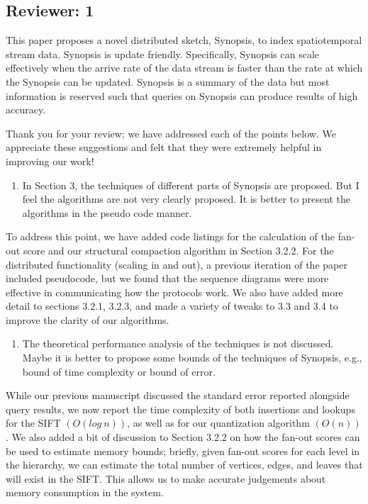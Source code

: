 \documentclass{article}
\begin{document}
\subsection*{Reviewer: 1}\label{reviewer-1}

This paper proposes a novel distributed sketch, Synopsis, to index
spatiotemporal stream data. Synopsis is update friendly. Specifically,
Synopsis can scale effectively when the arrive rate of the data stream
is faster than the rate at which the Synopsis can be updated. Synopsis
is a summary of the data but most information is reserved such that
queries on Synopsis can produce results of high accuracy.

\begin{tcolorbox}
Thank you for your review; we have addressed each of the points below. We appreciate these suggestions and felt that they were extremely helpful in improving our work!
\end{tcolorbox}

\begin{enumerate}
\def\labelenumi{\arabic{enumi})}
\item
  In Section 3, the techniques of different parts of Synopsis are
  proposed. But I feel the algorithms are not very clearly proposed. It
  is better to present the algorithms in the pseudo code manner.
\end{enumerate}

\begin{tcolorbox}
To address this point, we have added code listings for the calculation
of the fan-out score and our structural compaction algorithm in Section
3.2.2. For the distributed functionality (scaling in and out), a
previous iteration of the paper included pseudocode, but we found that
the sequence diagrams were more effective in communicating how the
protocols work. We also have added more detail to sections 3.2.1, 3.2.3,
and made a variety of tweaks to 3.3 and 3.4 to improve the clarity of
our algorithms.
\end{tcolorbox}

\begin{enumerate}
\def\labelenumi{\arabic{enumi})}
\setcounter{enumi}{1}
\item
  The theoretical performance analysis of the techniques is not
  discussed. Maybe it is better to propose some bounds of the techniques
  of Synopsis, e.g., bound of time complexity or bound of error.
\end{enumerate}

\begin{tcolorbox}
While our previous manuscript discussed the standard error reported alongside query results, we now report the time complexity of both insertions and lookups for the SIFT $(O(log\ n))$, as well as for our quantization algorithm $(O(n))$. We also added a bit of discussion to Section 3.2.2 on how the fan-out scores can be used to estimate memory bounds; briefly, given fan-out scores for each level in the hierarchy, we can estimate the total number of vertices, edges, and leaves that will exist in the SIFT.  This allows us to make accurate judgements about memory consumption in the system.
\end{tcolorbox}
\end{document}
